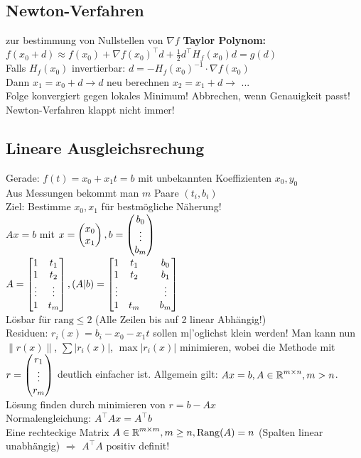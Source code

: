 \documentclass[german]{latex4ei/latex4ei_sheet}
\begin{document}
\subsection{Newton-Verfahren}
zur bestimmung von Nullstellen von $\nabla f$
\textbf{Taylor Polynom:} $f(x_0+d)\approx f(x_0) + \nabla f(x_0)^\top d + \frac{1}{2} d^\top H_f(x_0) d=g(d)$\\
Falls $H_f(x_0)$ invertierbar: $d=-H_f(x_0)^{-1} \cdot \nabla f(x_0)$\\
Dann $x_1=x_0+d \rightarrow d$ neu berechnen $x_2=x_1+d \rightarrow$ ...\\
Folge konvergiert gegen lokales Minimum! Abbrechen, wenn Genauigkeit passt! Newton-Verfahren klappt nicht immer!


\subsection{Lineare Ausgleichsrechung}
Gerade: $f(t)=x_0+x_1 t=b$ mit unbekannten Koeffizienten $x_0,y_0$\\
Aus Messungen bekommt man $m$ Paare $(t_i,b_i)$\\
Ziel: Bestimme $x_0,x_1$ f\"ur bestm\"ogliche N\"aherung!\\
$A x = b$ mit $x=\begin{pmatrix} x_0 \\ x_1 \end{pmatrix}, b=\begin{pmatrix} b_0 \\ \vdots \\ b_m \end{pmatrix}$\\
$A=\mat{1 & t_1\\ 1 & t_2 \\ \vdots & \vdots \\ 1 & t_m}, (A | b)=\mat{1 & t_1 &  & b_0\\ 1 & t_2 &  & b_1 \\ \vdots & & & \vdots \\ 1 & t_m & & b_m}$\\
L\"osbar f\"ur $\mathrm{rang} \le 2$ (Alle Zeilen bis auf 2 linear Abh\"angig!)\\
Residuen: $r_i(x)=b_i-x_0-x_1 t$ sollen m|'oglichst klein werden!
Man kann nun $\|r(x)\|$, $\sum |r_i(x)|$, $\max |r_i(x)|$ minimieren, wobei die Methode mit $r=\begin{pmatrix} r_1 \\ \vdots \\ r_m \end{pmatrix}$ deutlich einfacher ist.
Allgemein gilt: $A x = b, A \in \operatorname{\mathbb R}^{m \times n}, m>n$. L\"osung finden durch minimieren von $r=b-A x$\\
Normalengleichung: $A^\top A x=A^\top b$\\
Eine rechteckige Matrix $A \in \operatorname{\mathbb R}^{m \times m}, m\ge n, \mathrm{Rang}( A)=n$ (Spalten linear unabh\"angig) $\Rightarrow$ $A^\top A$ positiv definit!\\
\end{document}
